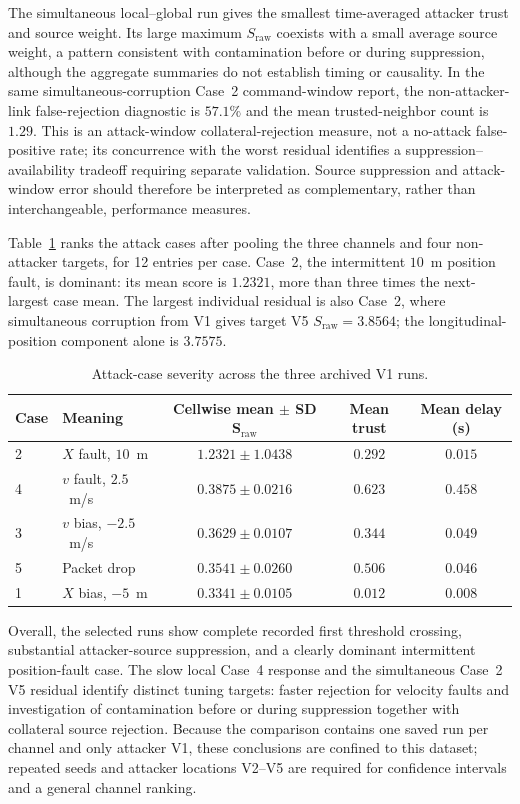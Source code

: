 The simultaneous local--global run gives the smallest time-averaged attacker trust and source weight. Its large maximum $S_{\mathrm{raw}}$ coexists with a small average source weight, a pattern consistent with contamination before or during suppression, although the aggregate summaries do not establish timing or causality. In the same simultaneous-corruption Case~2 command-window report, the non-attacker-link false-rejection diagnostic is $57.1\%$ and the mean trusted-neighbor count is $1.29$. This is an attack-window collateral-rejection measure, not a no-attack false-positive rate; its concurrence with the worst residual identifies a suppression--availability tradeoff requiring separate validation. Source suppression and attack-window error should therefore be interpreted as complementary, rather than interchangeable, performance measures.

Table~\ref{tab:case_ranking} ranks the attack cases after pooling the three channels and four non-attacker targets, for 12 entries per case. Case~2, the intermittent $10$~m position fault, is dominant: its mean score is $1.2321$, more than three times the next-largest case mean. The largest individual residual is also Case~2, where simultaneous corruption from V1 gives target V5 $S_{\mathrm{raw}}=3.8564$; the longitudinal-position component alone is $3.7575$.

\begin{table}[!t]
\centering
\caption{Attack-case severity across the three archived V1 runs.}
\label{tab:case_ranking}
\scriptsize
\setlength{\tabcolsep}{3pt}
\begin{tabular}{p{0.55cm}p{2.15cm}ccc}
\toprule
\textbf{Case} & \textbf{Meaning} & \shortstack{\textbf{Cellwise mean $\pm$ SD}\\$\boldsymbol{S}_{\mathrm{raw}}$} & \textbf{Mean trust} & \textbf{Mean delay (s)} \\
\midrule
2 & $X$ fault, $10$~m     & $1.2321\pm1.0438$ & $0.292$ & $0.015$ \\
4 & $v$ fault, $2.5$~m/s  & $0.3875\pm0.0216$ & $0.623$ & $0.458$ \\
3 & $v$ bias, $-2.5$~m/s  & $0.3629\pm0.0107$ & $0.344$ & $0.049$ \\
5 & Packet drop           & $0.3541\pm0.0260$ & $0.506$ & $0.046$ \\
1 & $X$ bias, $-5$~m      & $0.3341\pm0.0105$ & $0.012$ & $0.008$ \\
\bottomrule
\end{tabular}
\end{table}

Overall, the selected runs show complete recorded first threshold crossing, substantial attacker-source suppression, and a clearly dominant intermittent position-fault case. The slow local Case~4 response and the simultaneous Case~2 V5 residual identify distinct tuning targets: faster rejection for velocity faults and investigation of contamination before or during suppression together with collateral source rejection. Because the comparison contains one saved run per channel and only attacker V1, these conclusions are confined to this dataset; repeated seeds and attacker locations V2--V5 are required for confidence intervals and a general channel ranking.
